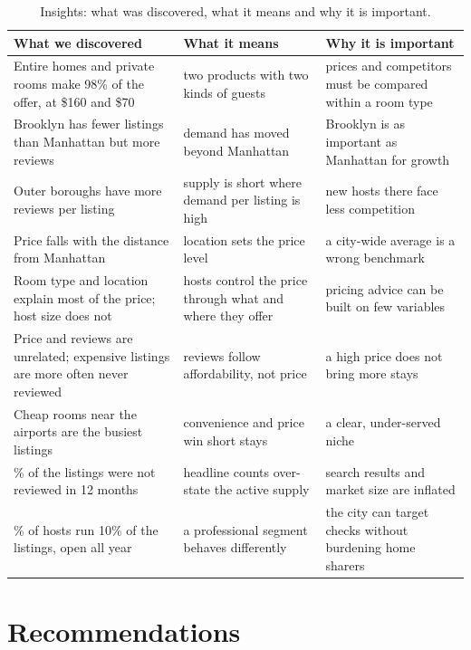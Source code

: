 \documentclass[12pt,a4paper]{article}
\begin{document}
\begin{table}[H]\centering\small
\caption{Insights: what was discovered, what it means and why it is important.}
\begin{tabularx}{\linewidth}{@{}>{\raggedright\arraybackslash}p{3.9cm}>{\raggedright\arraybackslash}X>{\raggedright\arraybackslash}X@{}}
\toprule
What we discovered & What it means & Why it is important\\\midrule
Entire homes and private rooms make 98\% of the offer, at \$160 and \$70 & two products with two kinds of guests & prices and competitors must be compared within a room type\\
Brooklyn has fewer listings than Manhattan but more reviews & demand has moved beyond Manhattan & Brooklyn is as important as Manhattan for growth\\
Outer boroughs have more reviews per listing & supply is short where demand per listing is high & new hosts there face less competition\\
Price falls with the distance from Manhattan & location sets the price level & a city-wide average is a wrong benchmark\\
Room type and location explain most of the price; host size does not & hosts control the price through what and where they offer & pricing advice can be built on few variables\\
Price and reviews are unrelated; expensive listings are more often never reviewed & reviews follow affordability, not price & a high price does not bring more stays\\
Cheap rooms near the airports are the busiest listings & convenience and price win short stays & a clear, under-served niche\\
40\% of the listings were not reviewed in 12 months & headline counts over-state the active supply & search results and market size are inflated\\
0.9\% of hosts run 10\% of the listings, open all year & a professional segment behaves differently & the city can target checks without burdening home sharers\\
\bottomrule
\end{tabularx}
\end{table}

\section{Recommendations}
\end{document}
